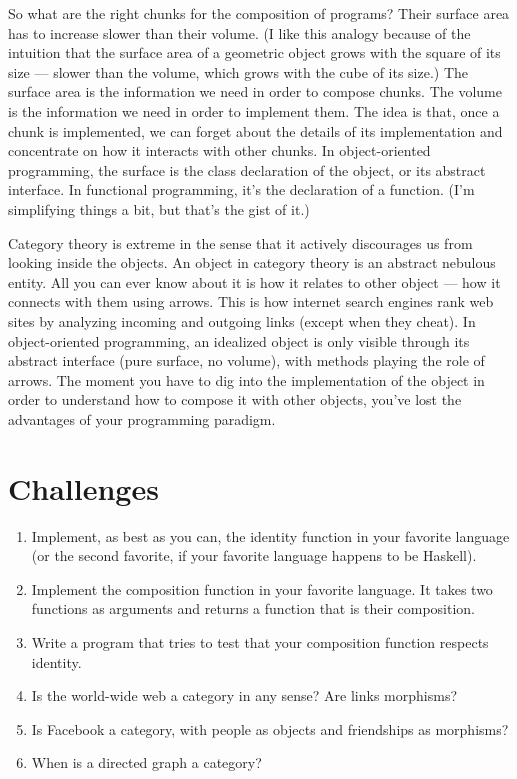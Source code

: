 So what are the right chunks for the composition of programs? Their
surface area has to increase slower than their volume. (I like this
analogy because of the intuition that the surface area of a geometric
object grows with the square of its size --- slower than the volume,
which grows with the cube of its size.) The surface area is the
information we need in order to compose chunks. The volume is the
information we need in order to implement them. The idea is that, once a
chunk is implemented, we can forget about the details of its
implementation and concentrate on how it interacts with other chunks. In
object-oriented programming, the surface is the class declaration of the
object, or its abstract interface. In functional programming, it's the
declaration of a function. (I'm simplifying things a bit, but that's the
gist of it.)

Category theory is extreme in the sense that it actively discourages us
from looking inside the objects. An object in category theory is an
abstract nebulous entity. All you can ever know about it is how it
relates to other object --- how it connects with them using arrows. This
is how internet search engines rank web sites by analyzing incoming and
outgoing links (except when they cheat). In object-oriented programming,
an idealized object is only visible through its abstract interface (pure
surface, no volume), with methods playing the role of arrows. The moment
you have to dig into the implementation of the object in order to
understand how to compose it with other objects, you've lost the
advantages of your programming paradigm.

\section{Challenges}\label{challenges}

\begin{enumerate}
\tightlist
\item
  Implement, as best as you can, the identity function in your favorite
  language (or the second favorite, if your favorite language happens to
  be Haskell).
\item
  Implement the composition function in your favorite language. It takes
  two functions as arguments and returns a function that is their
  composition.
\item
  Write a program that tries to test that your composition function
  respects identity.
\item
  Is the world-wide web a category in any sense? Are links morphisms?
\item
  Is Facebook a category, with people as objects and friendships as
  morphisms?
\item
  When is a directed graph a category?
\end{enumerate}